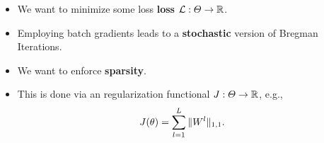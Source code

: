 {{\begin{minipage}[t]{\colwidth}
%
\begin{minipage}[t]{.48\textwidth}%
\vskip0pt%
\begin{itemize}%
\small%
\item We want to minimize some loss \textcolor{BaseDarkColor}{\textbf{loss}} $\mathcal{L}:\Theta\to\mathbb{R}$.
\item Employing batch gradients leads to a \textcolor{BaseDarkColor}{\textbf{stochastic}} version of Bregman Iterations.
\end{itemize}
\end{minipage}%
%
\hfill%
%
\begin{minipage}[t]{.48\textwidth}%
\vskip0pt%
\begin{itemize}%
\small%
\item We want to enforce \textcolor{BaseDarkColor}{\textbf{sparsity}}.
\item This is done via an regularization functional $J:\Theta\to\mathbb{R}$, e.g.,
%
\begin{align*}
J(\theta) &= \sum_{l=1}^L \Vert W^l\Vert_{1,1}.
\end{align*}
\end{itemize}%
\end{minipage}%


%
\begin{minipage}[t]{\textwidth}%
\end{minipage}
\end{minipage}}}
